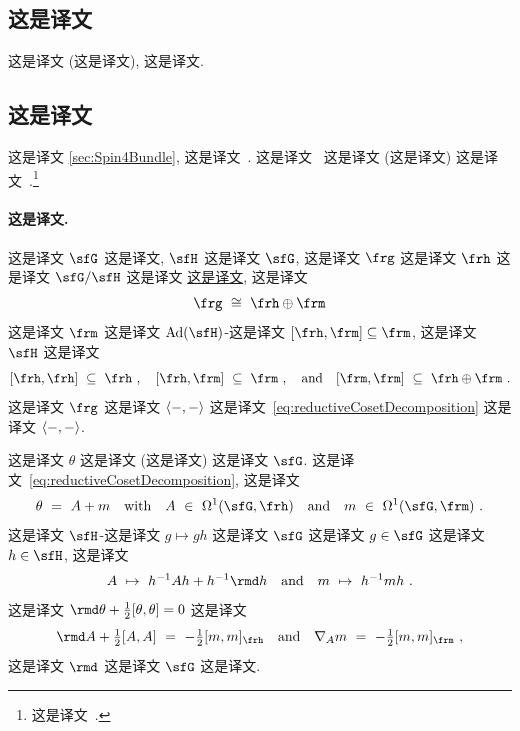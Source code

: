 \documentclass[
    affil-it, %
    auth-lg, %
    british, %
    compression, %
    contents, %
    custom-packages={}, %
    references={bigone}, %
]{lib/preprint}
\begin{document}
\begin{body}
        \section{这是译文}
        
这是译文 (这是译文), 这是译文.
        
        \subsection{这是译文}\label{app:YMCoset}
        
 这是译文 \cref{sec:Spin4Bundle}, 这是译文~\cite[Section II.11]{Kobayashi:1963}. 这是译文~\cite{Trautman:1977im,Harnad:1980ct} 这是译文 (这是译文) 这是译文~\cite{Trautman:1977im,Bais:1985ns}.\footnote{这是译文~\cite{Ivanova:2009yi}.} 
        
        \paragraph{这是译文.}
 这是译文 $\sfG$ 这是译文, $\sfH$ 这是译文 $\sfG$, 这是译文 $\frg$ 这是译文 $\frh$ 这是译文 $\sfG/\sfH$ 这是译文 \uline{这是译文}, 这是译文         \begin{equation}\label{eq:reductiveCosetDecomposition}
            \frg\ \cong\ \frh\oplus\frm
        \end{equation}  这是译文 $\frm$ 这是译文 $\Ad(\sfH)$-这是译文 $[\frh,\frm]\subseteq\frm$, 这是译文 $\sfH$ 这是译文         \begin{equation}\label{eq:reductiveCosetConditions}
            [\frh,\frh]\ \subseteq\ \frh~,
            \quad
            [\frh,\frm]\ \subseteq\ \frm~,
            \eand
            [\frm,\frm]\ \subseteq\ \frh\oplus\frm~.
        \end{equation}  这是译文 $\frg$ 这是译文 $\langle-,-\rangle$ 这是译文~\eqref{eq:reductiveCosetDecomposition} 这是译文 $\langle-,-\rangle$.
        
 这是译文 $\theta$ 这是译文 (这是译文) 这是译文 $\sfG$. 这是译文~\eqref{eq:reductiveCosetDecomposition}, 这是译文         \begin{equation}
            \theta\ =\ A+m
            \ewith
            A\ \in\ \Omega^1(\sfG,\frh)
            \eand
            m\ \in\ \Omega^1(\sfG,\frm)~.
        \end{equation}  这是译文 $\sfH$-这是译文 $g\mapsto gh$ 这是译文 $\sfG$ 这是译文 $g\in\sfG$ 这是译文 $h\in\sfH$, 这是译文         \begin{equation}
            A\ \mapsto\ h^{-1}Ah+h^{-1}\rmd h
            \eand
            m\ \mapsto\ h^{-1}mh~.
        \end{equation}  这是译文 $\rmd\theta+\frac12[\theta,\theta]=0$ 这是译文         \begin{equation}\label{eq:decompositionMCFormReductive}
            \rmd A+\tfrac12[A,A]\ =\ -\tfrac12[m,m]_\frh
            \eand
            \nabla_Am\ =\ -\tfrac12[m,m]_\frm~,
        \end{equation}  这是译文 $\rmd$ 这是译文 $\sfG$ 这是译文.
        

\end{body}
\end{document}
